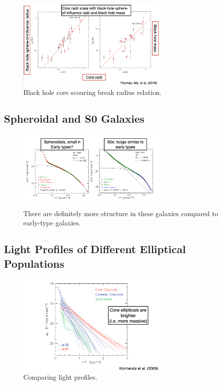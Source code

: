 \documentclass{article}
\begin{document}
\begin{figure}
    \centering
\includegraphics[width=0.66\textwidth]{figs/Screen Shot 2021-10-15 at 10.06.51 AM.png}
    \caption{Black hole core scouring break radius relation. }
    \label{fig:core_radius_black_hole}
\end{figure}

\subsection{Spheroidal and S0 Galaxies}

\begin{figure}
    \centering
\includegraphics[width=0.66\textwidth]{figs/Screen Shot 2021-10-15 at 10.09.11 AM.png}
    \caption{There are definitely more structure in these galaxies compared to early-type galaxies.  }
    \label{fig:spheroidal_galaxies}
\end{figure}

\subsection{Light Profiles of Different Elliptical Populations}

\begin{figure}
    \centering
\includegraphics[width=0.66\textwidth]{figs/Screen Shot 2021-10-15 at 10.10.43 AM.png}
    \caption{Comparing light profiles. }
    \label{fig:light_profiles}
\end{figure}
\end{document}
